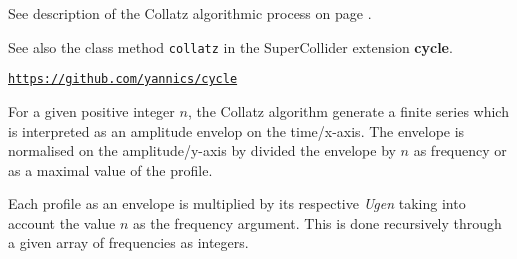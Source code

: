 %
%
%
%
%
%
%

See description of the Collatz algorithmic process on page \pageref{colres}. 

See also the class method \texttt{collatz} in the SuperCollider extension \textbf{cycle}. %

\href{https://github.com/yannics/cl-mst}{\texttt{\small https://github.com/yannics/cycle}}

\bigskip
For a given positive integer $n$, the Collatz algorithm generate a finite series which is interpreted as an amplitude envelop on the time/x-axis. The envelope is normalised on the amplitude/y-axis by divided the envelope by $n$ as frequency or as a maximal value of the profile. 

\bigskip

Each profile as an envelope is multiplied by its respective \textit{Ugen} taking into account the value $n$ as the frequency argument. This is done recursively through a given array of frequencies as integers.


